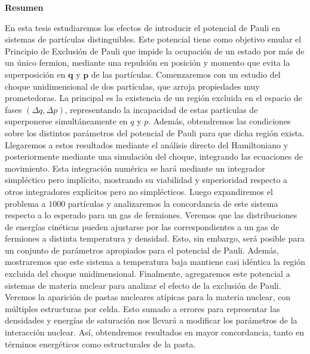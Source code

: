 \textbf{\Large Resumen}

\vspace{1cm}

En esta tesis estudiaremos los efectos de introducir el potencial de Pauli en sistemas de partículas distinguibles.
Este potencial tiene como objetivo emular el Principio de Exclusión de Pauli que impide la ocupación de un estado por más de un único fermion, mediante una repulsión en posición y momento 
que evita la superposición en $\mathbf{q}$ y $\mathbf{p}$ de las partículas.
Comenzaremos con un estudio del choque unidimensional de dos partículas, que arroja propiedades muy prometedoras.
La principal es la existencia de un región excluida en el espacio de fases $(\Delta q,\Delta p)$, representando la incapacidad de estas partículas de superponerse simultáneamente en $q$ y $p$.
Además, obtendremos las condiciones sobre los distintos parámetros del potencial de Pauli para que dicha región exista.
Llegaremos a estos resultados mediante el análisis directo del Hamiltoniano y posteriormente mediante una simulación del choque, integrando las ecuaciones de movimiento.
Esta integración numérica se hará mediante un integrador simpléctico pero implícito, mostrando su viabilidad y superioridad respecto a otros integradores explícitos pero no simplécticos.
Luego expandiremos el problema a $1000$ partículas y analizaremos la concordancia de este sistema respecto a lo esperado para un gas de fermiones.
Veremos que las distribuciones de energías cinéticas pueden ajustarse por las correspondientes a un gas de fermiones a distinta temperatura y densidad. 
Esto, sin embargo, será posible para un conjunto de parámetros apropiados para el potencial de Pauli.
Además, mostraremos que este sistema a temperatura baja mantiene casi idéntica la región excluida del choque unidimensional.
Finalmente, agregaremos este potencial a sistemas de materia nuclear para analizar el efecto de la exclusión de Pauli.
Veremos la aparición de pastas nucleares atípicas para la materia nuclear, con múltiples estructuras por celda.
Esto sumado a errores para representar las densidades y energías de saturación nos llevará a modificar los parámetros de la interacción nuclear.
Así, obtendremos resultados en mayor concordancia, tanto en términos energéticos como estructurales de la pasta.